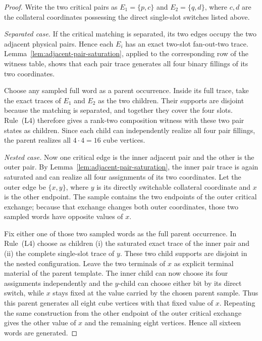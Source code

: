 \documentclass[11pt]{article}
\begin{document}
\begin{proof}
Write the two critical pairs as $E_1=\{p,c\}$ and $E_2=\{q,d\}$, where $c,d$
are the collateral coordinates possessing the direct single-slot switches
listed above.

\emph{Separated case.}
If the critical matching is separated, its two edges occupy the two adjacent
physical pairs.  Hence each $E_i$ has an exact two-slot fan-out-two trace.
Lemma~\ref{lem:adjacent-pair-saturation}, applied to the corresponding row of
the witness table, shows that each pair trace generates all four binary
fillings of its two coordinates.

Choose any sampled full word as a parent occurrence.  Inside its full trace,
take the exact traces of $E_1$ and $E_2$ as the two children.  Their supports
are disjoint because the matching is separated, and together they cover the
four slots.  Rule~(L4) therefore gives a rank-two composition witness with
these two pair states as children.  Since each child can independently realize
all four pair fillings, the parent realizes all $4\cdot4=16$ cube vertices.

\emph{Nested case.}
Now one critical edge is the inner adjacent pair and the other is the outer
pair.  By Lemma~\ref{lem:adjacent-pair-saturation}, the inner pair trace is
again saturated and can realize all four assignments of its two coordinates.
Let the outer edge be $\{x,y\}$, where $y$ is its directly switchable
collateral coordinate and $x$ is the other endpoint.  The sample contains the
two endpoints of the outer critical exchange; because that exchange changes
both outer coordinates, those two sampled words have opposite values of $x$.

Fix either one of those two sampled words as the full parent occurrence.  In
Rule~(L4) choose as children (i) the saturated exact trace of the inner pair and
(ii) the complete single-slot trace of $y$.  These two child supports are
disjoint in the nested configuration.  Leave the two terminals of $x$ as
explicit terminal material of the parent template.  The inner child can now
choose its four assignments independently and the $y$-child can choose either
bit by its direct switch, while $x$ stays fixed at the value carried by the
chosen parent sample.  Thus this parent generates all eight cube vertices with
that fixed value of $x$.  Repeating the same construction from the other
endpoint of the outer critical exchange gives the other value of $x$ and the
remaining eight vertices.  Hence all sixteen words are generated.
\end{proof}
\end{document}
